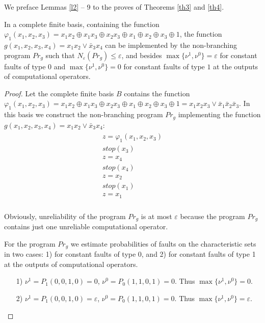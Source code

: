 \documentclass[
11pt,%
tightenlines,%
twoside,%
onecolumn,%
nofloats,%
nobibnotes,%
nofootinbib,%
superscriptaddress,%
noshowpacs,%
centertags]%
{revtex4}
\begin{document}
We preface Lemmas \ref{l2} -- 9 to the proves of Theorems \ref{th3} and \ref{th4}.

\begin{lemma}\label{l2}
In a complete finite basis, containing the function
$\varphi_1(x_1, x_2, x_3)=x_1 x_2\oplus x_1 x_3 \oplus x_2 x_3 \oplus
x_1 \oplus x_2 \oplus x_3 \oplus 1$, the function $g(x_1, x_2, x_3, x_4)= x_1
x_2 \vee \bar{x}_3 x_4$ can be implemented by the non-branching program $Pr_g$ such that $N_\varepsilon(Pr_g)\leq \varepsilon$, and besides $\max\{\nu^1, \nu^0\}=\varepsilon$ for constant faults of type $0$ and $\max\{\nu^1, \nu^0\}=0$ for constant faults of type $1$ at the outputs of computational operators.
\end{lemma}

\begin{proof}
Let the complete finite basis $B$ contains the function $\varphi_1(x_1, x_2, x_3)=x_1 x_2\oplus x_1 x_3 \oplus x_2 x_3 \oplus x_1 \oplus x_2 \oplus x_3 \oplus 1=x_1x_2x_3\vee \bar{x}_1\bar{x}_2\bar{x}_3$. In this basis we construct the non-branching program $Pr_g$ implementing the function $g(x_1, x_2, x_3, x_4)= x_1
x_2 \vee \bar{x}_3 x_4$:
\begin{eqnarray*}
\begin{array}{l}
  z=\varphi_1(x_1, x_2, x_3) \\
  stop(x_3) \\
  z=x_4  \\
  stop(x_4) \\
  z=x_2 \\
  stop(x_1) \\
  z=x_1  \\
\end{array}
\end{eqnarray*}

Obviously, unreliability of the program $Pr_g$ is at most $\varepsilon$ because the program $Pr_g$ contains just one unreliable computational operator.

For the program $Pr_g$ we estimate probabilities of faults on the characteristic sets in two cases: 1) for constant faults of type 0, and 2) for constant faults of type 1 at the outputs of computational operators.
\begin{itemize}
\item[1)]  $\nu^1=P_1(0, 0, 1, 0)=0$,  $\nu^0=P_0(1, 1, 0, 1)=0$. Thus $\max\{\nu^1, \nu^0\}=0$.
\item[2)]  $\nu^1=P_1(0, 0, 1, 0)=\varepsilon$,  $\nu^0=P_0(1, 1, 0, 1)=0$. Thus $\max\{\nu^1, \nu^0\}=\varepsilon$.
\end{itemize}

\end{proof}
\end{document}

